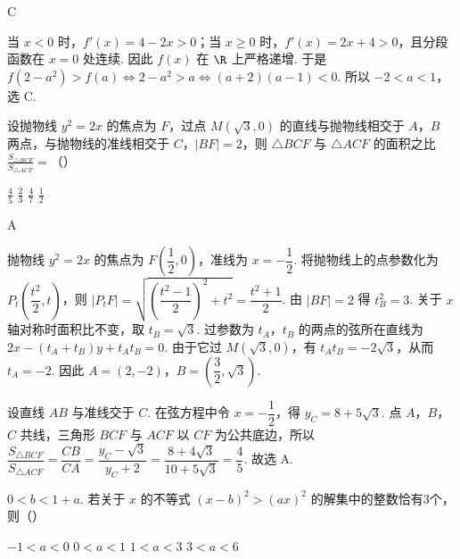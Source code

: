 \begin{answer}
C
\end{answer}

\begin{solution}
当 \(x<0\) 时，\(f'(x)=4-2x>0\)；当 \(x\geqslant0\) 时，\(f'(x)=2x+4>0\)，且分段函数在 \(x=0\) 处连续. 因此 \(f(x)\) 在 \(\R\) 上严格递增. 于是
\(f(2-a^2)>f(a)\iff2-a^2>a\iff(a+2)(a-1)<0\).
所以 \(-2<a<1\)，选 C.
\end{solution}

\begin{problem}
设抛物线 \( y^{2} = 2x \) 的焦点为 \(F\)，过点 \( M(\sqrt{3}, 0) \) 的直线与抛物线相交于 \(A\)，\(B\) 两点，与抛物线的准线相交于 \(C\)，\(|BF| = 2\)，则 \( \triangle BCF \) 与 \( \triangle ACF \) 的面积之比 \( \frac{S_{\triangle BCF}}{S_{\triangle ACF}} = \)（\quad）

\choices
    {\( \frac{4}{5} \)}
    {\( \frac{2}{3} \)}
    {\( \frac{4}{7} \)}
    {\( \frac{1}{2} \)}
\end{problem}

\begin{answer}
A
\end{answer}

\begin{solution}
抛物线 \(y^2=2x\) 的焦点为 \(F\left(\dfrac12,0\right)\)，准线为 \(x=-\dfrac12\). 将抛物线上的点参数化为 \(P_t\left(\dfrac{t^2}{2},t\right)\)，则
\(\lvert P_tF\rvert=\sqrt{\left(\dfrac{t^2-1}{2}\right)^2+t^2}=\dfrac{t^2+1}{2}\).
由 \(\lvert BF\rvert=2\) 得 \(t_B^2=3\). 关于 \(x\) 轴对称时面积比不变，取 \(t_B=\sqrt3\). 过参数为 \(t_A\)，\(t_B\) 的两点的弦所在直线为 \(2x-(t_A+t_B)y+t_At_B=0\). 由于它过 \(M(\sqrt3,0)\)，有 \(t_At_B=-2\sqrt3\)，从而 \(t_A=-2\). 因此 \(A=(2,-2)\)，\(B=\left(\dfrac32,\sqrt3\right)\).

设直线 \(AB\) 与准线交于 \(C\). 在弦方程中令 \(x=-\dfrac12\)，得 \(y_C=8+5\sqrt3\). 点 \(A\)，\(B\)，\(C\) 共线，三角形 \(BCF\) 与 \(ACF\) 以 \(CF\) 为公共底边，所以
\(\dfrac{S_{\triangle BCF}}{S_{\triangle ACF}}=\dfrac{CB}{CA}=\dfrac{y_C-\sqrt3}{y_C+2}=\dfrac{8+4\sqrt3}{10+5\sqrt3}=\dfrac45\).
故选 A.
\end{solution}

\begin{problem}
\(0 < b < 1 + a\). 若关于 \(x\) 的不等式 \((x - b)^2 > (ax)^2\) 的解集中的整数恰有\(3\)个，则（\quad）

\choices
    {\(-1 < a < 0\)}
    {\(0 < a < 1\)}
    {\(1 < a < 3\)}
    {\(3 < a < 6\)}
\end{problem}

